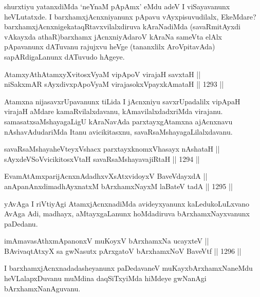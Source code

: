 \begin{artha}
shurxtiyu yatanxdiMda `neYnaM pApAmx' eMdu adeV I viSayavanunx heVLutatxde. I barxhamxjAcnxniyanunx pApavu vAyxpisuvudilalx, EkeMdare? barxhamxjAcnxnigekataqRtavxvilalxdiruva kAraNadiMda (savaRmitAyxdi vAkayxda athaR)barxhamx jAcnxniyAdaroV kAraNa sameVta elAlx pApavanunx dATuvanu rajujxvu heVge (tananxlilx AroVpitavAda) sapARdigaLanunx dATuvudo hAgeye.
\end{artha}

\begin{shl}
AtamxyAthAtamxyXvitosxV\s yaM vipApoV virajaH savxtaH || \\
niSakxmAR sAyxdivxpApoV\s yaM virajasokxV\s payxkAmataH \hfill || 1293 ||  
\end{shl}

\begin{artha}
Atamxna nijasavxrUpavanunx tiLida I jAcnxniyu savxrUpadalilx vipApaH virajaH aMdare kamaRvilalxdavanu, kAmavilalxdadxriMda virajanu. samasatxsaMshayagaLigU kAraNavAda parxtayxgAtamxna ajAcnxnavu nAshavAdudariMda Itanu avicikitasxnu, savaRsaMshayagaLilalxdavanu.
\end{artha}

\begin{shl}
savaRsaMshayaheVteyxVshacx parxtayxknomxVhasayx nAshataH || \\
sAyxdeVSoV\s vicikitosxV\s taH savaRsaMshayavajiRtaH \hfill || 1294 ||  
\end{shl}

\vskip 2cm

\begin{shl}
EvamAtAmxparijAcnxnAdadhxvXsAtxvidoyxV BaveVdayxdA || \\
anApanAnxdimadhAyxnatxM bArxhamxNayxM laBateV tadA \hfill || 1295 ||  
\end{shl}

\begin{artha}
yAvAga I riVtiyAgi AtamxjAcnxnadiMda avideyxyanunx kaLedukoLuLxvano AvAga Adi, madhayx, aMtayxgaLanunx hoMdadiruva bArxhamxNayxvanunx paDedanu.
\end{artha}

\begin{shl}
imAmavasAthxmApanonxV muKoyxV bArxhamxNa ucayxteV || \\
BAvivaqtAtxyX sa gwNasutx pArxgatoV bArxhamxNoV BaveVtf \hfill || 1296 ||  
\end{shl}

\begin{artha}
I barxhamxjAcnxnadadasheyanunx paDedavaneV muKayxbArxhamxNaneMdu heVLalapxDuvanu muMdina daqSiTxyiMda hiMdeye gwNanAgi bArxhamxNanAguvanu.
\end{artha}

